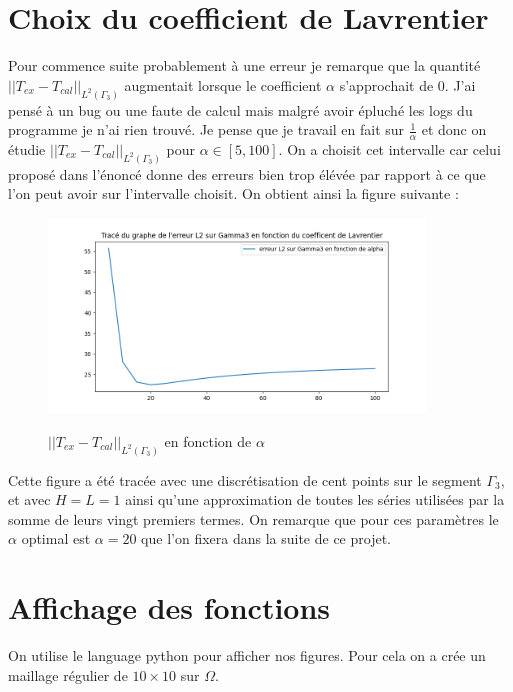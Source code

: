 \documentclass{article}
\begin{document}
\section{Choix du coefficient de Lavrentier}
Pour commence suite probablement à une erreur je remarque que la quantité $||T_{ex} - T_{cal}||_{L^2(\Gamma_3)}$ augmentait lorsque le coefficient $\alpha$ s'approchait de $0$. J'ai pensé à un bug ou une faute de calcul mais malgré avoir épluché les logs du programme je n'ai rien trouvé. Je pense que je travail en fait sur $\frac{1}{\alpha}$ et donc on étudie $||T_{ex} - T_{cal}||_{L^2(\Gamma_3)}$ pour $\alpha \in [5, 100]$. On a choisit cet intervalle car celui proposé dans l'énoncé donne des erreurs bien trop élévée par rapport à ce que l'on peut avoir sur l'intervalle choisit. On obtient ainsi la figure suivante :


\begin{figure}[h]
  \centering
  \includegraphics[width=10cm]{erreur_sur_Gamma3_lavrentier.png}
  \label{fig/domaine}
  \caption{$||T_{ex} - T_{cal}||_{L^2(\Gamma_3)}$ en fonction de $\alpha$}
\end{figure}

\vspace{1cm}
Cette figure a été tracée avec une discrétisation de cent points sur le segment $\Gamma_3$, et avec $H = L = 1$ ainsi qu'une approximation de toutes les séries utilisées par la somme de leurs  vingt premiers termes. On remarque que pour ces paramètres le $\alpha$ optimal est $\alpha = 20$ que l'on fixera dans la suite de ce projet.

\newpage

\section{Affichage des fonctions}
On utilise le language python pour afficher nos figures. Pour cela on a crée un maillage régulier de $10 \times 10$
sur $\Omega$.
\end{document}
